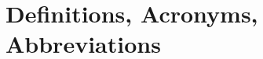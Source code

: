 \documentclass[../../rasd.tex]{subfiles}
\begin{document}
\section{Definitions, Acronyms, Abbreviations\label{sect:1.3}}
\end{document}
